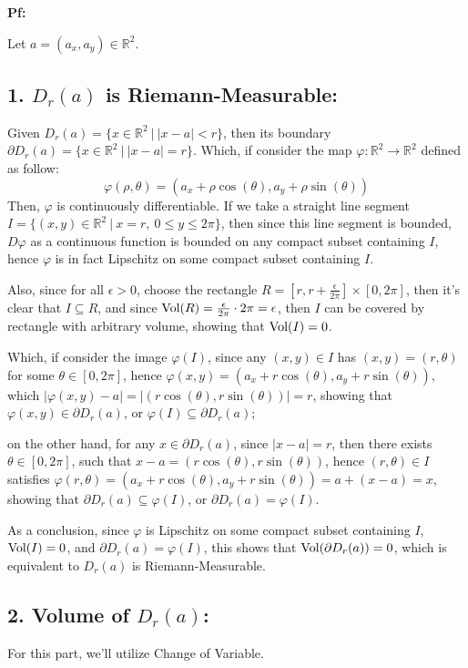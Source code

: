 \documentclass{article}
\begin{document}
\textbf{Pf:}

Let $a = (a_x,a_y)\in\mathbb{R}^2$.
\subsection*{1. $D_r(a)$ is Riemann-Measurable:}
Given $D_r(a)=\{x\in\mathbb{R}^2\ |\ |x-a|<r\}$, then its boundary $\partial D_r(a) = \{x\in\mathbb{R}^2\ |\ |x-a|=r\}$. Which, if consider the map $\varphi:\mathbb{R}^2\rightarrow\mathbb{R}^2$ defined as follow:
\begin{equation}
    \varphi(\rho,\theta) = (a_x+\rho\cos(\theta),a_y+\rho\sin(\theta))
\end{equation}
Then, $\varphi$ is continuously differentiable. If we take a straight line segment $I = \{(x,y)\in\mathbb{R}^2\ |\ x=r,\ 0\leq y\leq 2\pi\}$, then since this line segment is bounded, $D\varphi$ as a continuous function is bounded on any compact subset containing $I$, hence $\varphi$ is in fact Lipschitz on some compact subset containing $I$.

Also, since for all $\epsilon>0$, choose the rectangle $R=[r,r+\frac{\epsilon}{2\pi}]\times [0,2\pi]$, then it's clear that $I\subseteq R$, and since $\textmd{Vol}(R) = \frac{\epsilon}{2\pi}\cdot 2\pi = \epsilon$, then $I$ can be covered by rectangle with arbitrary volume, showing that $\textmd{Vol}(I)=0$.

Which, if consider the image $\varphi(I)$, since any $(x,y)\in I$ has $(x,y)=(r,\theta)$ for some $\theta\in [0,2\pi]$, hence $\varphi(x,y)=(a_x+r\cos(\theta),a_y+r\sin(\theta))$, which $|\varphi(x,y)-a| = |(r\cos(\theta),r\sin(\theta))| = r$, showing that $\varphi(x,y)\in \partial D_r(a)$, or $\varphi(I)\subseteq \partial D_r(a)$; 

on the other hand, for any $x\in \partial D_r(a)$, since $|x-a|=r$, then there exists $\theta\in[0,2\pi]$, such that $x-a = (r\cos(\theta),r\sin(\theta))$, hence $(r,\theta)\in I$ satisfies $\varphi(r,\theta)=(a_x+r\cos(\theta),a_y+r\sin(\theta)) = a+(x-a) = x$, showing that $\partial D_r(a)\subseteq \varphi(I)$, or $\partial D_r(a)=\varphi(I)$.

As a conclusion, since $\varphi$ is Lipschitz on some compact subset containing $I$, $\textmd{Vol}(I)=0$, and $\partial D_r(a)=\varphi(I)$, this shows that $\textmd{Vol}(\partial D_r(a)) = 0$, which is equivalent to $D_r(a)$ is Riemann-Measurable.

\subsection*{2. Volume of $D_r(a)$:}
For this part, we'll utilize Change of Variable. 
\end{document}

